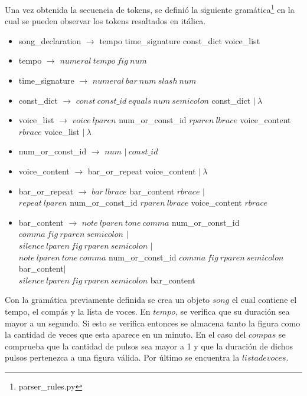 \documentclass[a4paper, 10pt, twoside]{article}
\begin{document}
Una vez obtenida la secuencia de tokens, se definió la siguiente gramática\footnote{parser\_rules.py} en la cual se pueden observar los tokens resaltados en itálica.

\begin{itemize}
 \item song\_declaration $\rightarrow$ tempo time\_signature const\_dict voice\_list

 \item tempo $\rightarrow$ $numeral\ tempo\ fig\ num$

 \item time\_signature $\rightarrow$ $numeral\ bar\ num\ slash\ num$

 \item const\_dict $\rightarrow$ $const\ const\_id\ equals\ num\ semicolon$ const\_dict $\mid\ \lambda$

 \item voice\_list $\rightarrow$ $voice\ lparen$ num\_or\_const\_id $rparen\ lbrace$ voice\_content $rbrace$ voice\_list $\mid\ \lambda$

 \item num\_or\_const\_id $\rightarrow$ $num$ $\mid\ const\_id$

 \item voice\_content $\rightarrow$ bar\_or\_repeat voice\_content $\mid\ \lambda$

 \item bar\_or\_repeat $\rightarrow$ $bar\ lbrace$ bar\_content $rbrace$ $\mid$ 
 \\ \-\hspace{2.5cm} $repeat\ lparen$ num\_or\_const\_id $rparen\ lbrace$ voice\_content $rbrace$

 \item bar\_content $\rightarrow$ $note\ lparen\ tone\ comma$ num\_or\_const\_id $comma\ fig\ rparen\ semicolon$ $\mid$ 
 \\ \-\hspace{2.2cm} $silence\ lparen\ fig\ rparen\ semicolon$ $\mid$
 \\ \-\hspace{2.2cm} $note\ lparen\ tone\ comma$ num\_or\_const\_id $comma\ fig\ rparen\ semicolon$ bar\_content$\mid$
 \\ \-\hspace{2.2cm} $silence\ lparen\ fig\ rparen\ semicolon$ bar\_content

\end{itemize}

Con la gramática previamente definida se crea un objeto $song$ el cual contiene el tempo, el compás y la lista de voces. En $tempo$, se verifica que su duración sea mayor a un segundo. Si esto se verifica entonces se almacena tanto la figura como la cantidad de veces que esta aparece en un minuto. En el caso del $compas$ se comprueba que la cantidad de pulsos sea mayor a 1 y que la duración de dichos pulsos pertenezca a una figura válida. Por último se encuentra la $lista de voces$. 
\end{document}

